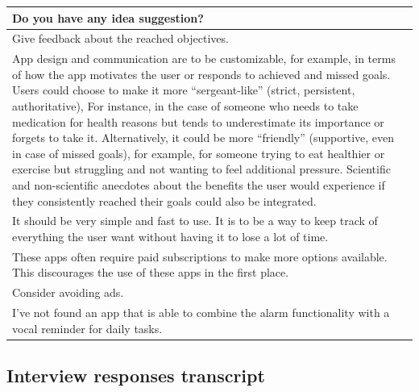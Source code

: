 \documentclass{article}
\begin{document}
\begin{table}[H]
    \centering
    \begin{tabularx}{0.9\textwidth}{X}
        \hline
        \textbf{Do you have any idea suggestion?} \\
        \hline
        Give feedback about the reached objectives. \\
        \hline
        App design and communication are to be customizable, for example, in terms of how the app motivates the user or responds to achieved and missed goals. Users could choose to make it more “sergeant-like” (strict, persistent, authoritative), For instance, in the case of someone who needs to take medication for health reasons but tends to underestimate its importance or forgets to take it. Alternatively, it could be more “friendly” (supportive, even in case of missed goals), for example, for someone trying to eat healthier or exercise but struggling and not wanting to feel additional pressure. Scientific and non-scientific anecdotes about the benefits the user would experience if they consistently reached their goals could also be integrated. \\
        \hline
        It should be very simple and fast to use. It is to be a way to keep track of everything the user want without having it to lose a lot of time. \\
        \hline
        These apps often require paid subscriptions to make more options available. This discourages the use of these apps in the first place. \\
        \hline
        Consider avoiding ads. \\
        \hline
        I've not found an app that is able to combine the alarm functionality with a vocal reminder for daily tasks. \\
        \hline
    \end{tabularx}
\end{table}

\subsection{Interview responses transcript}
\label{subsec:interview-responses}
\end{document}
